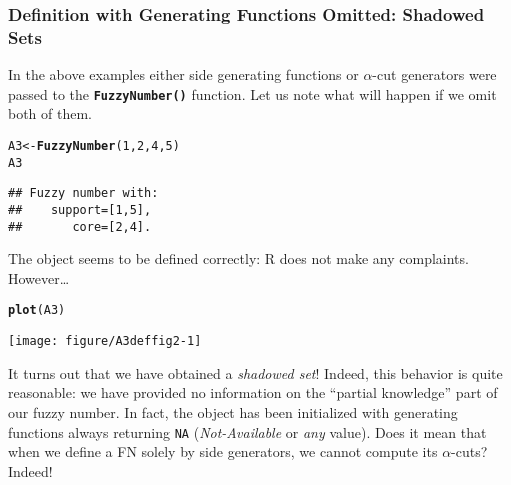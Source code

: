\documentclass[11pt]{article}\usepackage[]{graphicx}\usepackage[]{color}
\makeatletter
\newcommand{\hlnum}[1]{\textcolor[rgb]{0.686,0.059,0.569}{#1}}%
\newcommand{\hlstd}[1]{\textcolor[rgb]{0.345,0.345,0.345}{#1}}%
\newcommand{\hlkwb}[1]{\textcolor[rgb]{0.69,0.353,0.396}{#1}}%
\newcommand{\hlkwd}[1]{\textcolor[rgb]{0.737,0.353,0.396}{\textbf{#1}}}%
\newenvironment{kframe}{%
 \def\at@end@of@kframe{}%
 \ifinner\ifhmode%
  \def\at@end@of@kframe{\end{minipage}}%
  \begin{minipage}{\columnwidth}%
 \fi\fi%
 \def\FrameCommand##1{\hskip\@totalleftmargin \hskip-\fboxsep
 \colorbox{shadecolor}{##1}\hskip-\fboxsep
     \hskip-\linewidth \hskip-\@totalleftmargin \hskip\columnwidth}%
 \MakeFramed {\advance\hsize-\width
   \@totalleftmargin\z@ \linewidth\hsize
   \@setminipage}}%
 {\par\unskip\endMakeFramed%
 \at@end@of@kframe}
\newenvironment{knitrout}{}{} %
\newcommand{\lang}[1]{\textsf{#1}\xspace}
\newcommand{\R}{\lang{R}}
\newcommand{\func}[1]{\texttt{\hlkwd{#1}}}
\makeatother
\begin{document}
\subsubsection{Definition with Generating Functions Omitted: Shadowed Sets}

In the above examples
either side generating functions or $\alpha$-cut generators
were passed to the \func{FuzzyNumber()} function.
Let us note what will happen if we omit both of them.

\begin{knitrout}\small
{}\color{fgcolor}\begin{kframe}
\begin{alltt}
\hlstd{A3} \hlkwb{<-} \hlkwd{FuzzyNumber}\hlstd{(}\hlnum{1}\hlstd{,} \hlnum{2}\hlstd{,} \hlnum{4}\hlstd{,} \hlnum{5}\hlstd{)}
\hlstd{A3}
\end{alltt}
\begin{verbatim}
## Fuzzy number with:
##    support=[1,5],
##       core=[2,4].
\end{verbatim}
\end{kframe}
\end{knitrout}

\noindent
The object seems to be defined correctly: \R does not make any
complaints. However\dots

\begin{knitrout}\small
{}\color{fgcolor}\begin{kframe}
\begin{alltt}
\hlkwd{plot}\hlstd{(A3)}
\end{alltt}
\end{kframe}
\end{knitrout}

\begin{center}
\begin{knitrout}\small
{}\color{fgcolor}

{\centering \texttt{[image: figure/A3deffig2-1]} 

}



\end{knitrout}
\end{center}

\noindent
It turns out that we have obtained a \textit{shadowed set}!
Indeed, this behavior is quite reasonable: we have provided no information
on the ``partial knowledge'' part of our fuzzy number.
In fact, the object has been initialized
with generating functions always returning \texttt{NA}
(\textit{Not-Available} or \textit{any} value).
Does it mean that when we define a FN solely by side generators, we
cannot compute its $\alpha$-cuts? Indeed!
\end{document}
